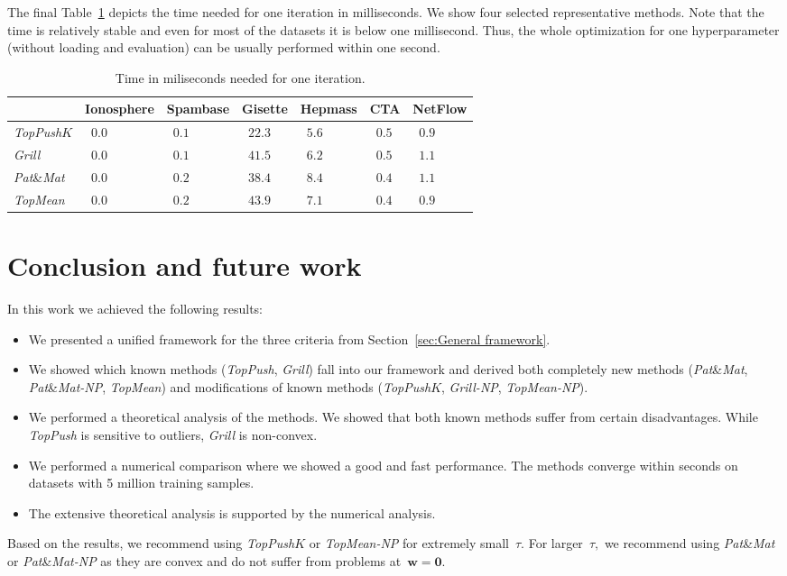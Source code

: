 \documentclass[11pt,a4paper]{article}
\theoremstyle{definition}
\newcommand{\toppush}{\textit{TopPush}\xspace}
\newcommand{\toppushk}{\textit{TopPush$K$}\xspace}
\newcommand{\grill}{\textit{Grill}\xspace}
\newcommand{\patmat}{\textit{Pat}\textup{\&}\textit{Mat}\xspace}
\newcommand{\topmean}{\textit{TopMean}\xspace}
\newcommand{\grillnp}{\textit{Grill-NP}\xspace}
\newcommand{\patmatnp}{\textit{Pat}\textup{\&}\textit{Mat-NP}\xspace}
\newcommand{\topmeannp}{\textit{TopMean-NP}\xspace}
\begin{document}
The final Table~\ref{tab:time} depicts the time needed for one iteration in milliseconds. We show four selected representative methods. Note that the time is relatively stable and even for most of the datasets it is below one millisecond. Thus, the whole optimization for one hyperparameter (without loading and evaluation) can be usually performed within one second.
\begin{table}[!ht]
  \caption{Time in miliseconds needed for one iteration.}
  \label{tab:time}
  \centering
  \begin{tabular}{@{} lllllll @{}}
    \toprule
              & \bf Ionosphere & \bf Spambase & \bf Gisette & \bf Hepmass & \bf CTA & \bf NetFlow \\
    \midrule
    \toppushk &~$0.0$          &~$0.1$        &~$22.3$      &~$5.6$       &~$0.5$   &~$0.9$ \\
    \grill    &~$0.0$          &~$0.1$        &~$41.5$      &~$6.2$       &~$0.5$   &~$1.1$ \\
    \patmat   &~$0.0$          &~$0.2$        &~$38.4$      &~$8.4$       &~$0.4$   &~$1.1$ \\
    \topmean  &~$0.0$          &~$0.2$        &~$43.9$      &~$7.1$       &~$0.4$   &~$0.9$ \\
    \bottomrule
  \end{tabular}
\end{table}



\section{Conclusion and future work}


In this work we achieved the following results:
\begin{itemize}
  \item We presented a unified framework for the three criteria from Section~\ref{sec:General framework}.
  \item We showed which known methods (\toppush, \grill) fall into our framework and derived both completely new methods (\patmat, \patmatnp, \topmean) and modifications of known methods (\toppushk, \grillnp, \topmeannp).
  \item We performed a theoretical analysis of the methods. We showed that both known methods suffer from certain disadvantages. While \toppush is sensitive to outliers, \grill is non-convex.
  \item We performed a numerical comparison where we showed a good and fast performance. The methods converge within seconds on datasets with 5 million training samples.
  \item The extensive theoretical analysis is supported by the numerical analysis.
\end{itemize}
Based on the results, we recommend using \toppushk or \topmeannp for extremely small~$\tau.$ For larger~$\tau,$ we recommend using \patmat or \patmatnp as they are convex and do not suffer from problems at~$\bm{w}=\bm{0}.$
\end{document}
